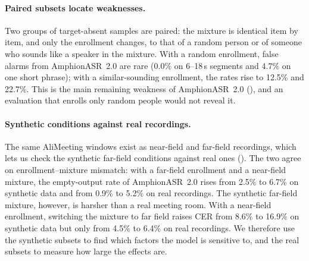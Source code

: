 \paragraph{Paired subsets locate weaknesses.}
Two groups of target-absent samples are paired: the mixture is identical item by item, and only the enrollment changes, to that of a random person or of someone who sounds like a speaker in the mixture.
With a random enrollment, false alarms from AmphionASR~2.0 are rare (0.0\% on 6--18\,s segments and 4.7\% on one short phrase); with a similar-sounding enrollment, the rates rise to 12.5\% and 22.7\%.
This is the main remaining weakness of AmphionASR~2.0 (), and an evaluation that enrolls only random people would not reveal it.

\paragraph{Synthetic conditions against real recordings.}
The same AliMeeting windows exist as near-field and far-field recordings, which lets us check the synthetic far-field conditions against real ones ().
The two agree on enrollment--mixture mismatch: with a far-field enrollment and a near-field mixture, the empty-output rate of AmphionASR~2.0 rises from 2.5\% to 6.7\% on synthetic data and from 0.9\% to 5.2\% on real recordings.
The synthetic far-field mixture, however, is harsher than a real meeting room.
With a near-field enrollment, switching the mixture to far field raises CER from 8.6\% to 16.9\% on synthetic data but only from 4.5\% to 6.4\% on real recordings.
We therefore use the synthetic subsets to find which factors the model is sensitive to, and the real subsets to measure how large the effects are.

